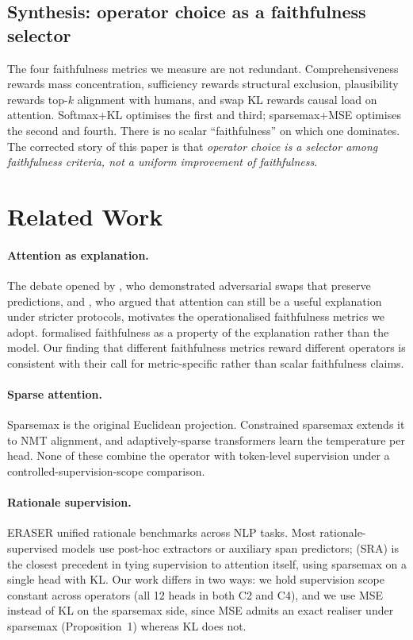 \documentclass{article}
\begin{document}
\subsection{Synthesis: operator choice as a faithfulness selector}

The four faithfulness metrics we measure are not redundant. Comprehensiveness rewards
mass concentration, sufficiency rewards structural exclusion, plausibility rewards
top-$k$ alignment with humans, and swap KL rewards causal load on attention. Softmax+KL
optimises the first and third; sparsemax+MSE optimises the second and fourth. There is
no scalar ``faithfulness'' on which one dominates. The corrected story of this paper is
that \emph{operator choice is a selector among faithfulness criteria, not a uniform
improvement of faithfulness}.

\section{Related Work}
\label{sec:related}

\paragraph{Attention as explanation.}
The debate opened by \citet{jain2019attention}, who demonstrated adversarial swaps that
preserve predictions, and \citet{wiegreffe2019attention}, who argued that attention can
still be a useful explanation under stricter protocols, motivates the operationalised
faithfulness metrics we adopt. \citet{jacovi2020faithful} formalised faithfulness as a
property of the explanation rather than the model. Our finding that different
faithfulness metrics reward different operators is consistent with their call for
metric-specific rather than scalar faithfulness claims.

\paragraph{Sparse attention.}
Sparsemax \citep{martins2016sparsemax} is the original Euclidean projection. Constrained
sparsemax \citep{malaviya2018sparse} extends it to NMT alignment, and adaptively-sparse
transformers \citep{correia2019adaptively} learn the temperature per head. None of these
combine the operator with token-level supervision under a controlled-supervision-scope
comparison.

\paragraph{Rationale supervision.}
ERASER \citep{deyoung2020eraser} unified rationale benchmarks across NLP tasks. Most
rationale-supervised models use post-hoc extractors or auxiliary span predictors;
\citet{eilertsen2025aligning} (SRA) is the closest precedent in tying supervision to
attention itself, using sparsemax on a single head with KL. Our work differs in two
ways: we hold supervision scope constant across operators (all 12 heads in both C2 and
C4), and we use MSE instead of KL on the sparsemax side, since MSE admits an exact
realiser under sparsemax (Proposition~1) whereas KL does not.
\end{document}
